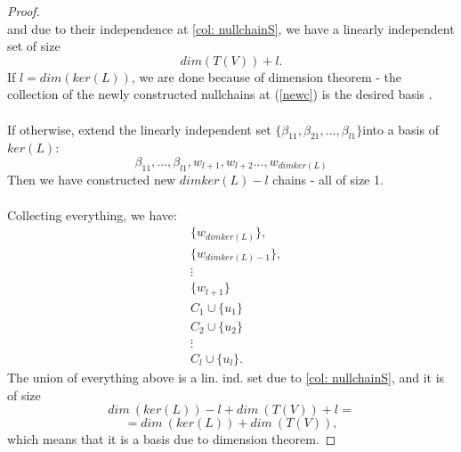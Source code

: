 \documentclass{article}
\theoremstyle{definition}
\begin{document}
\begin{proof}
\begin{equation}
\end{equation}
and due to their independence at \ref{col: nullchainS}, we have a linearly independent set of size $$dim(T(V))+l.$$
If $l=dim (ker(L))$, we are done because of dimension theorem - the collection of the newly constructed nullchains at (\ref{newc})  is the desired basis .\\ \\
If otherwise, extend the linearly independent set $\{\beta_{11}, \beta_{21},...,\beta_{l1}\}$into a basis of $ker(L)$: $${\beta_{11}, ...,\beta_{l1}, w_{l+1},w_{l+2}...,w_{dimker(L)}}$$Then we have constructed new $dim ker(L)-l$ chains - all of size 1. \\ \\
Collecting everything, we have:
\[
\begin{aligned}
&\{w_{dimker(L)}\},\\
&\{w_{dimker(L)-1}\},\\
&\vdots\\
&\{w_{l+1}\}\\
&C_1\cup \{u_1\}\\
&C_2\cup \{u_2\}\\
&\vdots\\
&C_l \cup \{u_l\}.
\end{aligned}
\]
The union of everything above is a lin. ind. set due to \ref{col: nullchainS}, and it is of size $$dim\ (ker(L))-l+dim\ (T(V)) + l=$$ $$=dim\ (ker(L))+dim\ (T(V)),$$which means that it is a basis due to dimension theorem.


\end{proof}
\end{document}
